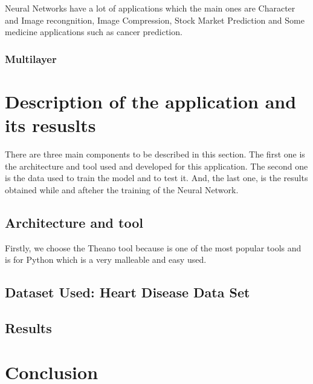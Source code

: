 \documentclass[12pt]{article}
\begin{document}
Neural Networks have a lot of applications which the main ones are Character and Image recongnition, Image Compression, Stock Market Prediction and Some medicine applications such as cancer prediction.
\subsubsection{Multilayer}

\section{Description of the application and its resuslts}

There are three main components to be described in this section. The first one is the architecture and tool used and developed for this application. The second one is the data used to train the model and to test it. And, the last one, is the results obtained while and afteher the training of the Neural Network.

\subsection{Architecture and tool}

Firstly, we choose the Theano tool because is one of the most popular tools and is for Python which is a very malleable and easy used.

\subsection{Dataset Used: Heart Disease Data Set \cite{Lichman:2013}}

\subsection{Results}

\section{Conclusion}



\end{document}
